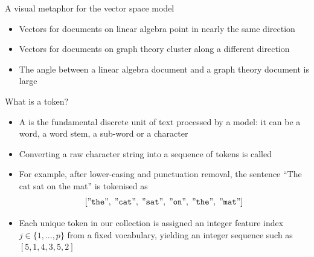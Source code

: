 \documentclass[aspectratio=169]{beamer}\usepackage[]{graphicx}\usepackage[]{xcolor}
\begin{document}
\begin{frame}{A visual metaphor for the vector space model}
\begin{center}
\end{center}
\vfill
\begin{itemize}
\item Vectors for documents on linear algebra point in nearly the same direction
\item Vectors for documents on graph theory cluster along a different direction
\item The angle between a linear algebra document and a graph theory document is large
\end{itemize}
\end{frame}


\begin{frame}{What is a token?}
\begin{itemize}
\item A  is the fundamental discrete unit of text processed by a model: it can be a word, a word stem, a sub-word or a character
\vfill
\item Converting a raw character string into a sequence of tokens is called 
\vfill
\item For example, after lower-casing and punctuation removal, the sentence ``The cat sat on the mat'' is tokenised as
\[
[{\tt "the"},\; {\tt "cat"},\; {\tt "sat"},\; {\tt "on"},\; {\tt "the"},\; {\tt "mat"}]
\]
\vfill
\item Each unique token in our collection is assigned an integer feature index $j \in \{1,\ldots,p\}$ from a fixed vocabulary, yielding an integer sequence such as $[5, 1, 4, 3, 5, 2]$
\end{itemize}
\end{frame}
\end{document}

